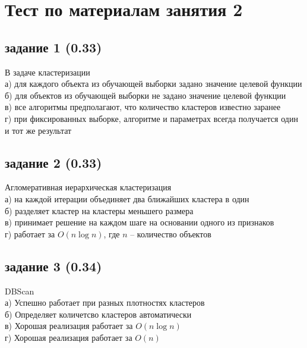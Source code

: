 \documentclass[10pt,a4paper]{article}
\begin{document}
\section*{Тест по материалам занятия 2}

\subsection*{задание 1 (0.33)}

В задаче кластеризации \\
а) для каждого объекта из обучающей выборки задано значение целевой функции  \\
б) для объектов из обучающей выборки не задано значение целевой функции  \\
в) все алгоритмы предполагают, что количество кластеров известно заранее \\
г) при фиксированных выборке, алгоритме и параметрах всегда получается один и тот же результат \\

\subsection*{задание 2 (0.33)}

Агломеративная иерархическая кластеризация \\
а) на каждой итерации объединяет два ближайших кластера в один \\
б) разделяет кластер на кластеры меньшего размера \\
в) принимает решение на каждом шаге на основании одного из признаков \\
г) работает за $O(n \log n)$, где $n$ -- количество объектов

\subsection*{задание 3 (0.34)}

DBScan \\
а) Успешно работает при разных плотностях кластеров \\
б) Определяет количетсво кластеров автоматически \\
в) Хорошая реализация работает за $O(n \log n)$ \\
г) Хорошая реализация работает за $O(n)$
\end{document}
